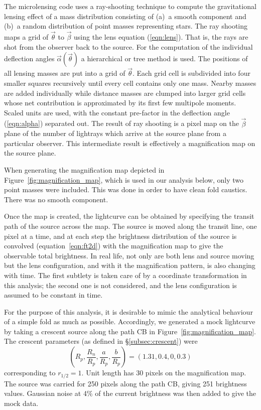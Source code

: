 \documentclass[usenatbib]{mn2e}
\begin{document}
The microlensing code uses a ray-shooting technique to compute the
gravitational lensing effect of a mass distribution consisting of
(a)~a smooth component and (b)~a random distribution of point masses
representing stars.  The ray shooting maps a grid of $\vec\theta$ to
$\vec\beta$ using the lens equation (\ref{eqn:lens}).  That is, the
rays are shot from the observer back to the source.  For the
computation of the individual deflection angles
$\vec\alpha(\vec\theta)$ a hierarchical or tree method is used.  The
positions of all lensing masses are put into a grid of $\vec\theta$.
Each grid cell is subdivided into four smaller squares recursively
until every cell contains only one mass.  Nearby masses are added
individually while distance masses are clumped into larger grid cells
whose net contribution is approximated by its first few multipole
moments.  Scaled units are used, with the constant pre-factor in the
deflection angle (\ref{eqn:alpha}) separated out.  The result of ray
shooting is a pixel map on the $\vec\beta$ plane of the number of
lightrays which arrive at the source plane from a particular observer.
This intermediate result is effectively a magnification map on the
source plane.

When generating the magnification map depicted in
Figure~\ref{fig:magnification_map}, which is used in our analysis
below, only two point masses were included.  This was done in order to
have clean fold caustics.  There was no smooth component.

Once the map is created, the lightcurve can be obtained by specifying
the transit path of the source across the map.  The source is moved
along the transit line, one pixel at a time, and at each step the
brightness distribution of the source is convolved
(equation~\ref{eqn:ft2d}) with the magnification map to give the
observable total brightness.  In real life, not only are both lens and
source moving but the lens configuration, and with it the
magnification pattern, is also changing with time.  The first subtlety
is taken care of by a coordinate transformation in this analysis; the
second one is not considered, and the lens configuration is assumed to
be constant in time.

For the purpose of this analysis, it is desirable to mimic the
analytical behaviour of a simple fold as much as possible.
Accordingly, we generated a mock lightcurve by taking a crescent
source along the path CB in Figure~\ref{fig:magnification_map}.  The
crescent parameters (as defined in \S\ref{subsec:crescent}) were
\begin{equation}
   \left(R_p, \frac{R_n}{R_p}, \frac{a}{R_p}, \frac{b}{R_p}\right) =
   (1.31, 0.4, 0, 0.3)
\label{eqn:cp}
\end{equation}
corresponding to $r_{1/2}=1$.  Unit length has 30 pixels on the
magnification map.  The source was carried for 250 pixels along the
path CB, giving 251 brightness values.  Gaussian noise at 4\% of the
current brightness was then added to give the mock data.
\end{document}
